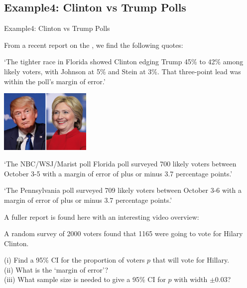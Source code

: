 \documentclass[t,xcolor=pdftex,dvipsnames,table]{beamer}
\begin{document}
\subsection[Examples]{Example4: Clinton vs Trump Polls}
\begin{frame}[fragile]{Example4: Clinton vs Trump Polls}

From a recent report on the \href{http://edition.cnn.com/2016/10/09/politics/hillary-clinton-donald-trump-florida-pennsylvania-polls/index.html}{}, we find the following quotes:

`The tighter race in Florida showed Clinton edging Trump 45\% to 42\% among likely voters, with Johnson at 5\% and Stein at 3\%. That three-point lead was within the poll's margin of error.'

\begin{center}
\includegraphics[height=3cm]{../images/ClintonTrump.jpg}
\end{center}
\end{frame}

\begin{frame}[fragile]{}
`The NBC/WSJ/Marist poll Florida poll surveyed 700 likely voters between October 3-5 with a margin of error of plus or minus 3.7 percentage points.' 

\vspace{.5cm}
`The Pennsylvania poll surveyed 709 likely voters between October 3-6 with a margin of error of plus or minus 3.7 percentage points.'

A fuller report is found here with an interesting video overview: 
\href{http://www.telegraph.co.uk/news/0/us-election-2016-polls-and-odds-tracker-latest-forecast-in-race/}{}

\vspace{.5cm}
A random survey of 2000 voters found that 1165 were going to vote for Hilary Clinton.  

\vspace{.5cm}
(i) Find a 95\% CI for the proportion of voters $p$ that will vote for Hillary.\\

(ii) What is the `margin of error'? \\

(iii) What sample size is needed to give a 95\% CI for $p$ with width $\pm 0.03$?
\end{frame}
\end{document}
